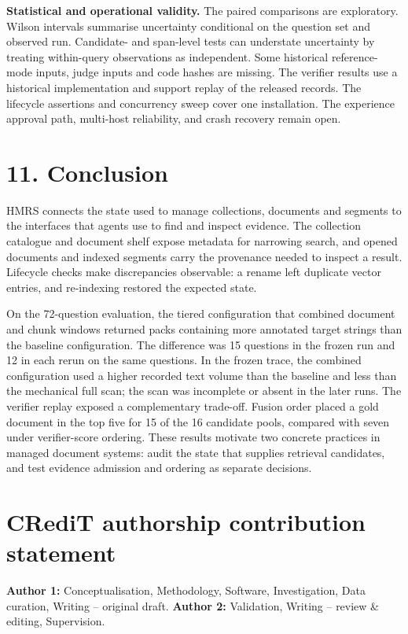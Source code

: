 \noindent\textbf{Statistical and operational validity.} The paired
comparisons are exploratory. Wilson intervals summarise uncertainty
conditional on the question set and observed run. Candidate- and span-level
tests can understate uncertainty by treating within-query observations as
independent. Some historical reference-mode inputs, judge inputs and code
hashes are missing. The verifier results use a historical implementation
and support replay of the released records. The lifecycle assertions and
concurrency sweep cover one installation. The experience approval path,
multi-host reliability, and crash recovery remain open.


\section{11. Conclusion}


HMRS connects the state used to manage collections, documents and segments
to the interfaces that agents use to find and inspect evidence. The
collection catalogue and document shelf expose metadata for narrowing
search, and opened documents and indexed segments carry the provenance
needed to inspect a result. Lifecycle checks make discrepancies observable:
a rename left duplicate vector entries, and re-indexing restored the expected
state.

On the 72-question evaluation, the tiered configuration that combined
document and chunk windows returned packs containing more annotated target
strings than the baseline configuration. The difference was 15 questions in the
frozen run and 12 in each rerun on the same questions.
In the frozen trace, the combined configuration used a higher recorded text
volume than the baseline and less than the mechanical full scan; the scan was
incomplete or absent in the later runs. The verifier
replay exposed a complementary trade-off. Fusion order placed a gold
document in the top five for 15 of the 16 candidate pools, compared with
seven under verifier-score ordering.
These results motivate two concrete practices in managed document systems:
audit the state that supplies retrieval candidates, and test evidence
admission and ordering as separate decisions.



\section*{CRediT authorship contribution statement}
\textbf{Author 1:} Conceptualisation, Methodology, Software, Investigation,
Data curation, Writing -- original draft. \textbf{Author 2:} Validation,
Writing -- review \& editing, Supervision. 
